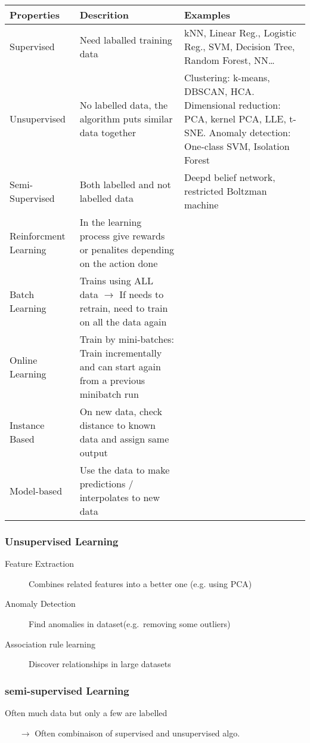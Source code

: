 \documentclass{article}
\begin{document}
\begin{tabular}{p{}p{}p{}}
  \textbf{Properties} & \textbf{Descrition} & \textbf{Examples} \\
  \hline
  Supervised &  Need laballed training data & kNN, Linear Reg., Logistic Reg., SVM, Decision Tree, Random Forest, NN\ldots \\
  Unsupervised & No labelled data, the algorithm puts similar data together & Clustering: k-means, DBSCAN, HCA. Dimensional reduction: PCA, kernel PCA, LLE, t-SNE. Anomaly detection: One-class SVM, Isolation Forest\\
  Semi-Supervised & Both labelled and not labelled data & Deepd belief network, restricted Boltzman machine \\
  Reinforcment Learning & In the learning process give rewards or penalites depending on the action done & \\
  \hline\hline
  Batch Learning & Trains using ALL data $\rightarrow$ If needs to retrain, need to train on all the data again & \\
  Online Learning & Train by mini-batches: Train incrementally and can start again from a previous minibatch run & \\
  \hline\hline
  Instance Based & On new data, check distance to known data and assign same output &\\
  Model-based & Use the data to make predictions / interpolates to new data & \\
\end{tabular}

\subsubsection{Unsupervised Learning}
\begin{description}
    \item[Feature Extraction] Combines related features into a better one (e.g. using PCA)
    \item[Anomaly Detection] Find anomalies in dataset(e.g.\ removing some outliers)
    \item[Association rule learning] Discover relationships in large datasets
\end{description}

\subsubsection{semi-supervised Learning}
Often much data but only a few are labelled
\begin{itemize}
  \item[$\rightarrow$] Often combinaison of supervised and unsupervised algo.
\end{itemize}
\end{document}
